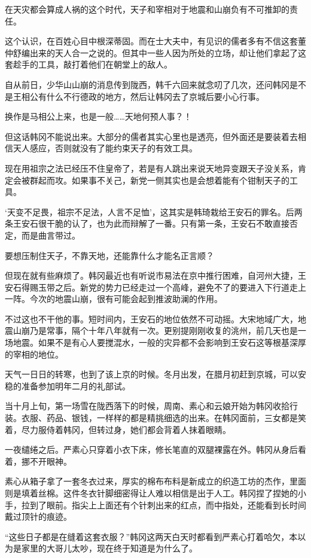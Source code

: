 在天灾都会算成人祸的这个时代，天子和宰相对于地震和山崩负有不可推卸的责任。

这个认识，在百姓心目中根深蒂固。而在士大夫中，有见识的儒者多有不信这套董仲舒编出来的天人合一之说的。但其中一些人因为所处的立场，却让他们拿起了这套趁手的工具，敲打着他们在朝堂上的敌人。

自从前日，少华山山崩的消息传到陇西，韩千六回来就念叨了几次，还问韩冈是不是王相公有什么不行德政的地方，然后让韩冈去了京城后要小心行事。

换作是马相公上来，也是一般……天地何预人事？！

但这话韩冈不能说出来。大部分的儒者其实心里也是透亮，但外面还是要装着去相信天人感应，否则就没有了能约束天子的有效工具。

现在用祖宗之法已经压不住皇帝了，若是有人跳出来说天地异变跟天子没关系，肯定会被群起而攻。如果事不关己，新党一侧其实也是会想着能有个钳制天子的工具。

‘天变不足畏，祖宗不足法，人言不足恤’，这其实是韩琦栽给王安石的罪名。后两条王安石很干脆的认了，也为此而辩解了一番。只有第一条，王安石不敢直接否定，而是曲言带过。

要想压制住天子，不靠天地，还能靠什么才能名正言顺？

但现在就有些麻烦了。韩冈最近也有听说市易法在京中推行困难，自河州大捷，王安石得赐玉带之后。新党的势力已经走过一个高峰，避免不了的要进入下行道走上一阵。今次的地震山崩，很有可能会起到推波助澜的作用。

不过这也不干他的事。短时间内，王安石的地位依然不可动摇。大宋地域广大，地震山崩乃是常事，隔个十年八年就有一次。更别提刚刚收复的洮州，前几天也是一场地震。如果不是有心人要搅混水，一般的灾异都不会影响到王安石这等根基深厚的宰相的地位。

天气一日日的转寒，也到了该上京的时候。冬月出发，在腊月初赶到京城，可以安稳的准备参加明年二月的礼部试。

当十月上旬，第一场雪在陇西落下的时候，周南、素心和云娘开始为韩冈收拾行装。衣服、药品、银钱，一样样的都是精挑细选的出来。在韩冈面前，三女都是笑着，尽力服侍着韩冈，但转过身，她们都会背着人抹着眼睛。

一夜缱绻之后。严素心只穿着小衣下床，修长笔直的双腿裸露在外。韩冈从身后看着，挪不开眼神。

素心从箱子拿了一套冬衣过来，厚实的棉布布料是新成立的织造工坊的杰作，里面则是填着丝棉。这件冬衣针脚细密得让人难以相信是出于人工。韩冈捏了捏她的小手，拉到了眼前。指尖上上面还有个针刺出来的红点，而中指处，还能看到长时间戴过顶针的痕迹。

“这些日子都是在缝着这套衣服？”韩冈这两天白天时都看到严素心打着哈欠，本以为是家里的大哥儿太吵，现在终于知道是为什么了。

